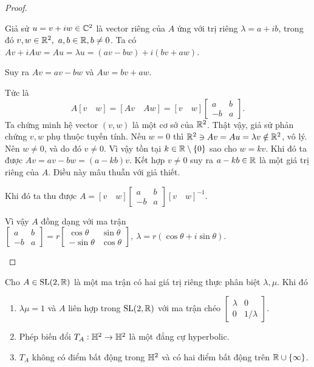 \begin{proof}
\begin{enumerate}
        Giả sử $u = v + iw \in \mathbb{C}^2$ là vector riêng của $A$ ứng với trị riêng $\lambda = a+ib$, trong đó $v,w\in\mathbb{R}^2,~a,b\in \mathbb{R}, b\neq 0$. Ta có $Av + iAw = Au = \lambda u = (av -bw)+i(bv + aw)$.
        
    Suy ra $Av = av -bw$ và $Aw = bv + aw$. 
    
    Tức là \[
        A[v \quad w] = [Av \quad Aw] = [v \quad w]
    \begin{bmatrix}
        a & b\\
        -b & a
    \end{bmatrix}.\]
    Ta chứng minh hệ vector $(v,w)$ là một cơ sở của $\mathbb{R}^2$. Thật vậy, giả sử phản chứng $v,w$ phụ thuộc tuyến tính. 
    Nếu $w = 0$ thì $\mathbb{R}^2 \ni Av = Au = \lambda v \notin \mathbb{R}^2$, vô lý. Nên  $w \neq 0$, và do đó $v \neq 0$. Vì vậy tồn tại $k\in \mathbb{R}\setminus\{0\}$ sao cho $w = kv$. Khi đó ta được $Av = av-bw = (a-kb)v$. Kết hợp $v \neq 0$ suy ra $a-kb \in \mathbb{R}$ là một giá trị riêng của $A$. Điều này mâu thuẫn với giả thiết.  
    
    Khi đó ta thu được $A = [v \quad w]
    \begin{bmatrix}
        a & b\\
        -b & a
    \end{bmatrix}[v \quad w]^{-1}$. 
    
    Vì vậy $A$ đồng dạng với  ma trận
    $\begin{bmatrix}
        a & b\\
        -b & a
    \end{bmatrix} = r\begin{bmatrix}
        \cos{\theta} & \sin{\theta}\\
        -\sin{\theta} & \cos{\theta}
    \end{bmatrix},~\lambda = r(\cos{\theta} + i \sin{\theta})$.
    \end{enumerate}
\end{proof}

\begin{prop}\label{prop 3.1.7}
    Cho $A \in \operatorname{SL}(2,\mathbb{R})$ là một ma trận có hai giá trị riêng thực phân biệt $\lambda, \mu$.  Khi đó
    \begin{enumerate}
        \item $\lambda \mu = 1$ và $A$ liên hợp trong $\operatorname{SL}(2,\mathbb{R})$ với ma trận chéo $\begin{bmatrix}
            \lambda & 0\\
            0 & 1/\lambda
        \end{bmatrix}$.
        \item Phép biến đổi $T_A: \mathbb{H}^2 \to \mathbb{H}^2$ là một đẳng cự hyperbolic.
        \item $T_A$ không có điểm bất động trong $\mathbb{H}^2$ và có hai điểm bất động trên $\mathbb{R} \cup \{\infty\}$.
    \end{enumerate}
\end{prop}

